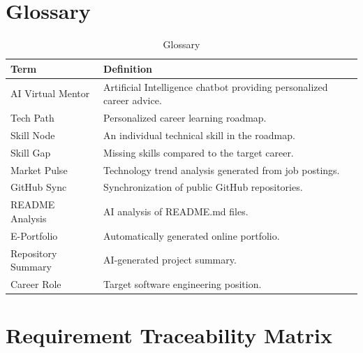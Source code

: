 
\section{Glossary}

\begin{table}[H]
\centering
\caption{Glossary}
\begin{tabular}{|l|p{10cm}|}
\hline

\textbf{Term} &
\textbf{Definition}
\\ \hline

AI Virtual Mentor &
Artificial Intelligence chatbot providing personalized career advice.
\\ \hline

Tech Path &
Personalized career learning roadmap.
\\ \hline

Skill Node &
An individual technical skill in the roadmap.
\\ \hline

Skill Gap &
Missing skills compared to the target career.
\\ \hline

Market Pulse &
Technology trend analysis generated from job postings.
\\ \hline

GitHub Sync &
Synchronization of public GitHub repositories.
\\ \hline

README Analysis &
AI analysis of README.md files.
\\ \hline

E-Portfolio &
Automatically generated online portfolio.
\\ \hline

Repository Summary &
AI-generated project summary.
\\ \hline

Career Role &
Target software engineering position.
\\ \hline

\end{tabular}
\end{table}


\section{Requirement Traceability Matrix}


